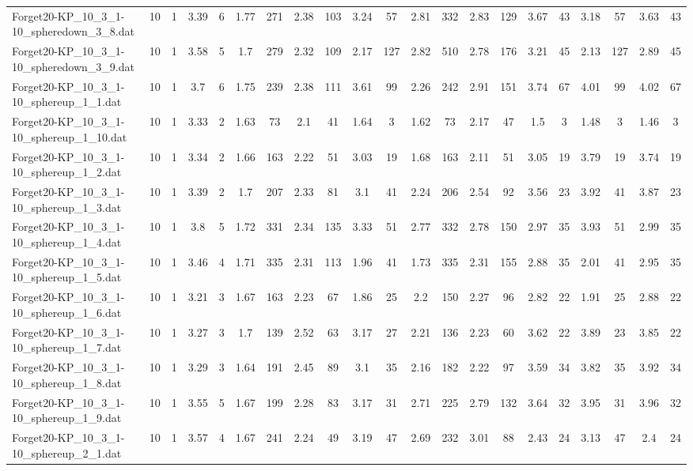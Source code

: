 \begin{sidewaystable}[!ht]
{\begin{tabular}{lcccccccccccccccccccc}
Forget20-KP\_10\_3\_1-10\_spheredown\_3\_8.dat & 10 & 1 & 3.39 & 6 & 1.77 & 271 & 2.38 & 103 & 3.24 & 57 & 2.81 & 332 & 2.83 & 129 & 3.67 & 43 & 3.18 & 57 & 3.63 & 43 \\
Forget20-KP\_10\_3\_1-10\_spheredown\_3\_9.dat & 10 & 1 & 3.58 & 5 & 1.7 & 279 & 2.32 & 109 & 2.17 & 127 & 2.82 & 510 & 2.78 & 176 & 3.21 & 45 & 2.13 & 127 & 2.89 & 45 \\
Forget20-KP\_10\_3\_1-10\_sphereup\_1\_1.dat & 10 & 1 & 3.7 & 6 & 1.75 & 239 & 2.38 & 111 & 3.61 & 99 & 2.26 & 242 & 2.91 & 151 & 3.74 & 67 & 4.01 & 99 & 4.02 & 67 \\
Forget20-KP\_10\_3\_1-10\_sphereup\_1\_10.dat & 10 & 1 & 3.33 & 2 & 1.63 & 73 & 2.1 & 41 & 1.64 & 3 & 1.62 & 73 & 2.17 & 47 & 1.5 & 3 & 1.48 & 3 & 1.46 & 3 \\
Forget20-KP\_10\_3\_1-10\_sphereup\_1\_2.dat & 10 & 1 & 3.34 & 2 & 1.66 & 163 & 2.22 & 51 & 3.03 & 19 & 1.68 & 163 & 2.11 & 51 & 3.05 & 19 & 3.79 & 19 & 3.74 & 19 \\
Forget20-KP\_10\_3\_1-10\_sphereup\_1\_3.dat & 10 & 1 & 3.39 & 2 & 1.7 & 207 & 2.33 & 81 & 3.1 & 41 & 2.24 & 206 & 2.54 & 92 & 3.56 & 23 & 3.92 & 41 & 3.87 & 23 \\
Forget20-KP\_10\_3\_1-10\_sphereup\_1\_4.dat & 10 & 1 & 3.8 & 5 & 1.72 & 331 & 2.34 & 135 & 3.33 & 51 & 2.77 & 332 & 2.78 & 150 & 2.97 & 35 & 3.93 & 51 & 2.99 & 35 \\
Forget20-KP\_10\_3\_1-10\_sphereup\_1\_5.dat & 10 & 1 & 3.46 & 4 & 1.71 & 335 & 2.31 & 113 & 1.96 & 41 & 1.73 & 335 & 2.31 & 155 & 2.88 & 35 & 2.01 & 41 & 2.95 & 35 \\
Forget20-KP\_10\_3\_1-10\_sphereup\_1\_6.dat & 10 & 1 & 3.21 & 3 & 1.67 & 163 & 2.23 & 67 & 1.86 & 25 & 2.2 & 150 & 2.27 & 96 & 2.82 & 22 & 1.91 & 25 & 2.88 & 22 \\
Forget20-KP\_10\_3\_1-10\_sphereup\_1\_7.dat & 10 & 1 & 3.27 & 3 & 1.7 & 139 & 2.52 & 63 & 3.17 & 27 & 2.21 & 136 & 2.23 & 60 & 3.62 & 22 & 3.89 & 23 & 3.85 & 22 \\
Forget20-KP\_10\_3\_1-10\_sphereup\_1\_8.dat & 10 & 1 & 3.29 & 3 & 1.64 & 191 & 2.45 & 89 & 3.1 & 35 & 2.16 & 182 & 2.22 & 97 & 3.59 & 34 & 3.82 & 35 & 3.92 & 34 \\
Forget20-KP\_10\_3\_1-10\_sphereup\_1\_9.dat & 10 & 1 & 3.55 & 5 & 1.67 & 199 & 2.28 & 83 & 3.17 & 31 & 2.71 & 225 & 2.79 & 132 & 3.64 & 32 & 3.95 & 31 & 3.96 & 32 \\
Forget20-KP\_10\_3\_1-10\_sphereup\_2\_1.dat & 10 & 1 & 3.57 & 4 & 1.67 & 241 & 2.24 & 49 & 3.19 & 47 & 2.69 & 232 & 3.01 & 88 & 2.43 & 24 & 3.13 & 47 & 2.4 & 24 \\

\end{tabular}}
\end{sidewaystable}

